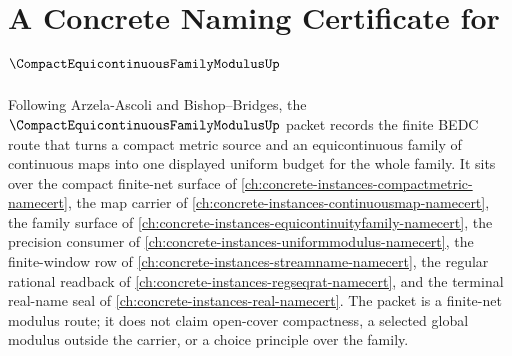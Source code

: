 \chapter{A Concrete Naming Certificate for $\CompactEquicontinuousFamilyModulusUp$}
\label{ch:concrete-instances-compact-equicontinuous-family-modulus-namecert}

Following Arzela-Ascoli and Bishop--Bridges, the $\CompactEquicontinuousFamilyModulusUp$ packet records the finite BEDC route that turns a compact metric source and an equicontinuous family of continuous maps into one displayed uniform budget for the whole family. It sits over the compact finite-net surface of \autoref{ch:concrete-instances-compactmetric-namecert}, the map carrier of \autoref{ch:concrete-instances-continuousmap-namecert}, the family surface of \autoref{ch:concrete-instances-equicontinuityfamily-namecert}, the precision consumer of \autoref{ch:concrete-instances-uniformmodulus-namecert}, the finite-window row of \autoref{ch:concrete-instances-streamname-namecert}, the regular rational readback of \autoref{ch:concrete-instances-regseqrat-namecert}, and the terminal real-name seal of \autoref{ch:concrete-instances-real-namecert}. The packet is a finite-net modulus route; it does not claim open-cover compactness, a selected global modulus outside the carrier, or a choice principle over the family.


